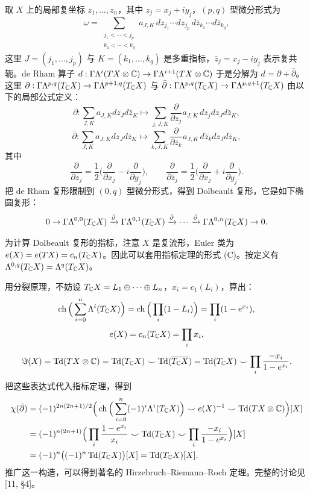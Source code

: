 取 $X$ 上的局部复坐标 $z_1,\ldots,z_n$，其中 $z_j=x_j+iy_j$，$(p,q)$ 型微分形式为
\[
\omega=\sum_{\substack{j_1<\cdots<j_p\\ k_1<\cdots<k_q}}a_{J,K}\,
dz_{j_1}\cdots dz_{j_p}\,d\bar z_{k_1}\cdots d\bar z_{k_q},
\]
这里 $J=(j_1,\ldots,j_p)$ 与 $K=(k_1,\ldots,k_q)$ 是多重指标，$\bar z_j=x_j-iy_j$ 表示复共轭。de Rham 算子 $d:\Gamma\Lambda^i(TX\otimes\mathbb{C})\to\Gamma\Lambda^{i+1}(TX\otimes\mathbb{C})$ 于是分解为
$d=\partial+\bar\partial$。这里 $\partial:\Gamma\Lambda^{p,q}(T_{\mathbb{C}} X)\to\Gamma\Lambda^{p+1,q}(T_{\mathbb{C}} X)$ 与 $\bar\partial:\Gamma\Lambda^{p,q}(T_{\mathbb{C}} X)\to\Gamma\Lambda^{p,q+1}(T_{\mathbb{C}} X)$ 由以下的局部公式定义：
\[
\partial:\sum_{J,K}a_{J,K}dz_Jd\bar z_K\mapsto
\sum_{j,J,K}\frac{\partial}{\partial z_j}a_{J,K}\,dz_jdz_Jd\bar z_K,
\]
\[
\bar\partial:\sum_{J,K}a_{J,K}dz_Jd\bar z_K\mapsto
\sum_{k,J,K}\frac{\partial}{\partial\bar z_k}a_{J,K}\,d\bar z_kdz_Jd\bar z_K,
\]
其中
\[
\frac{\partial}{\partial z_j}=\frac12\Big(\frac{\partial}{\partial x_j}-i\frac{\partial}{\partial y_j}\Big),
\qquad
\frac{\partial}{\partial\bar z_j}=\frac12\Big(\frac{\partial}{\partial x_j}+i\frac{\partial}{\partial y_j}\Big).
\]
把 de Rham 复形限制到 $(0,q)$ 型微分形式，得到 Dolbeault 复形，它是如下椭圆复形：
\[
0\to\Gamma\Lambda^{0,0}(T_{\mathbb{C}} X)\xrightarrow{\bar\partial}\Gamma\Lambda^{0,1}(T_{\mathbb{C}} X)
\xrightarrow{\bar\partial}\cdots\xrightarrow{\bar\partial}\Gamma\Lambda^{0,n}(T_{\mathbb{C}} X)\to 0.
\]

为计算 Dolbeault 复形的指标，注意 $X$ 是复流形，Euler 类为 $e(X)=e(TX)=c_n(T_{\mathbb{C}} X)$。因此可以套用指标定理的形式 (C)。按定义有 $\Lambda^{0,q}(T_{\mathbb{C}} X)=\Lambda^q(T_{\mathbb{C}} X)$。


用分裂原理，不妨设 $T_{\mathbb{C}} X=L_1\oplus\cdots\oplus L_n$，$x_i=c_1(L_i)$，算出：
\[
\operatorname{ch}\Big(\sum_{i=0}^n\Lambda^i(T_{\mathbb{C}} X)\Big)=\operatorname{ch}\Big(\prod_i(1-L_i)\Big)=\prod_i(1-e^{x_i}),
\]
\[
e(X)=c_n(T_{\mathbb{C}} X)=\prod_i x_i,
\]
\[
\Im(X)=\operatorname{Td}(TX\otimes\mathbb{C})=\operatorname{Td}(T_{\mathbb{C}} X)\smile\operatorname{Td}(\overline{T_{\mathbb{C}} X})
=\operatorname{Td}(T_{\mathbb{C}} X)\smile\prod_i\frac{-x_i}{1-e^{x_i}}.
\]
把这些表达式代入指标定理，得到
\[
\begin{aligned}
\chi(\bar\partial)&=(-1)^{2n(2n+1)/2}
\Big(\operatorname{ch}\Big(\sum_{i=0}^n(-1)^i\Lambda^i(T_{\mathbb{C}} X)\Big)\smile e(X)^{-1}\smile\operatorname{Td}(TX\otimes\mathbb{C})\Big)[X]\\
&=(-1)^{n(2n+1)}
\Big(\prod_i\frac{1-e^{x_i}}{x_i}\smile\operatorname{Td}(T_{\mathbb{C}} X)\smile\prod_i\frac{-x_i}{1-e^{x_i}}\Big)[X]\\
&=(-1)^n\big((-1)^n\operatorname{Td}(T_{\mathbb{C}} X)\big)[X]=\operatorname{Td}(T_{\mathbb{C}} X)[X].
\end{aligned}
\]
推广这一构造，可以得到著名的 Hirzebruch--Riemann--Roch 定理。完整的讨论见 [11, \S4]。

